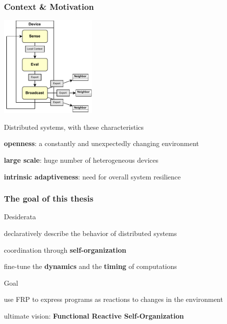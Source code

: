 \begin{frame}
    \titlepage
\end{frame}

\begin{frame}
    \frametitle{Context \& Motivation}
    \centering
    \includegraphics[height=5cm]{figures/proactive-model.pdf}
    \begin{blockitems}{Distributed systems, with these characteristics}
        \item \textbf{openness}: a constantly and unexpectedly changing environment
        \item \textbf{large scale}: huge number of heterogeneous devices
        \item \textbf{intrinsic adaptiveness}: need for overall system resilience
    \end{blockitems}
\end{frame}

\begin{frame}
    \frametitle{The goal of this thesis}
    \begin{blockitems}{Desiderata}
        \item declaratively describe the behavior of distributed systems
        \item coordination through \textbf{self-organization}
        \item fine-tune the \textbf{dynamics} and the \textbf{timing} of computations
    \end{blockitems}
    \begin{blockitems}{Goal}
        \item use FRP to express programs as reactions to changes in the environment
        \item ultimate vision: \textbf{Functional Reactive Self-Organization}
    \end{blockitems}
\end{frame}

